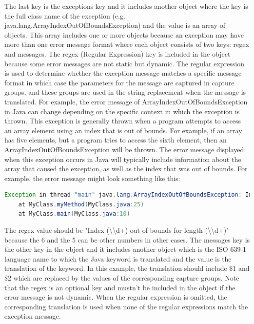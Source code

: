 The last key is the exceptions key and it includes another object where the key is the full class name of the exception (e.g. java.lang.ArrayIndexOutOfBoundsException) and the value is an array of objects. This array includes one or more objects because an exception may have more than one error message format where each object consists of two keys: regex and messages. The regex (Regular Expression) key is included in the object because some error messages are not static but dynamic. The regular expression is used to determine whether the exception message matches a specific message format in which case the parameters for the message are captured in capture groups, and these groups are used in the string replacement when the message is translated. For example, the error message of ArrayIndexOutOfBoundsException in Java can change depending on the specific context in which the exception is thrown. This exception is generally thrown when a program attempts to access an array element using an index that is out of bounds. For example, if an array has five elements, but a program tries to access the sixth element, then an ArrayIndexOutOfBoundsException will be thrown. The error message displayed when this exception occurs in Java will typically include information about the array that caused the exception, as well as the index that was out of bounds. For example, the error message might look something like this:
\begin{lstlisting}[language=java]
Exception in thread "main" java.lang.ArrayIndexOutOfBoundsException: Index 6 out of bounds for length 5
    at MyClass.myMethod(MyClass.java:25)
    at MyClass.main(MyClass.java:10)

\end{lstlisting}


The regex value should be "Index (\textbackslash{\textbackslash{d+}}) out of bounds for length (\textbackslash{\textbackslash{d+}})" because the 6 and the 5 can be other numbers in other cases. The messages key is the other key in the object and it includes another object which is the ISO 639-1 language name to which the Java keyword is translated and the value is the translation of the keyword. In this example, the translation should include \$1 and \$2 which are replaced by the values of the corresponding capture groups. Note that the regex is an optional key and mustn't be included in the object if the error message is not dynamic. When the regular expression is omitted, the corresponding translation is used when none of the regular expressions match the exception message.

